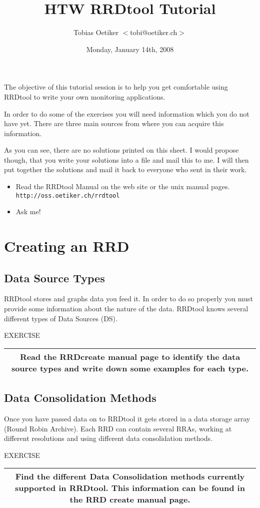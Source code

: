 \documentclass[a4paper,12pt]{article}
\title{HTW RRDtool Tutorial}
\date{Monday, January 14th, 2008}
\author{Tobias Oetiker $<$tobi@oetiker.ch$>$}
\newenvironment{work}{\textsf{\tiny EXERCISE}\nopagebreak\\[0.3ex]\begin{tabular}{|c|}
 \hline
 \begin{minipage}{0.965\linewidth}%
 \setlength{\parskip}{1.6ex plus 0.6ex minus 0.4ex}%
 \rule{0pt}{2.8ex}\ignorespaces}
{\rule[-1.8ex]{0pt}{0pt}\end{minipage}\\
 \hline
 \end{tabular}}
\newcommand{\ex}[1]{\subsection{#1}}
\newcommand{\cmd}[1]{\texttt{\mbox{#1}}}
\begin{document}
\maketitle

The objective of this tutorial session is to help you get comfortable using
RRDtool to write your own monitoring applications.

In order to do some of the exercises you will need information which
you do not have yet. There are three main sources from where you can
acquire this information.

As you can see, there are no solutions printed on this sheet. I would
propose though, that you write your solutions into a file and mail
this to me. I will then put together the solutions and mail it back
to everyone who sent in their work.

\begin{itemize}
\item Read the RRDtool Manual on the web site or the unix manual
  pages.\\ \cmd{http://oss.oetiker.ch/rrdtool}
\item Ask me!
\end{itemize}

\section{Creating an RRD}
\ex{Data Source Types}

RRDtool stores and graphs data you feed it. In order to do so
properly you must provide some information about the nature of the
data. RRDtool knows several different types of Data Sources (DS).

\begin{work}
  Read the RRDcreate manual page to identify the data source types
  and write down some examples for each type.
\end{work}

\ex{Data Consolidation Methods}

Once you have passed data on to RRDtool it gets stored in a data
storage array (Round Robin Archive). Each RRD can contain several
RRAs, working at different resolutions and using different data
consolidation methods.

\begin{work}
  Find the different Data Consolidation methods currently supported in
  RRDtool. This information can be found in the RRD create manual
  page.
\end{work}
\end{document}
